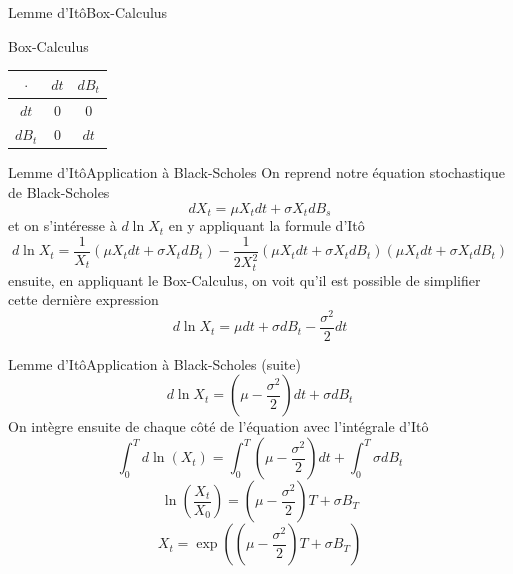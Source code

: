 \documentclass{beamer}
\newcommand{\1}{\mathmybb{1}}
\begin{document}
     \begin{frame}{Lemme d'Itô}{Box-Calculus}
       \begin{block}{Box-Calculus}
         \begin{center}
           \begin{tabular}{|c|c|c|}
             \hline
             $\cdot$ & $dt$ & $dB_t$ \\
             \hline
             $dt$ & 0 & 0 \\
             $dB_{t}$ & 0 & $dt$ \\
             \hline
           \end{tabular}
         \end{center}
         \end{block}
       \end{frame}
   \begin{frame}{Lemme d'Itô}{Application à Black-Scholes}
     On reprend notre équation stochastique de Black-Scholes
     \begin{equation}
       dX_{t} = \mu X_{t} dt + \sigma X_{t} dB_{s}
     \end{equation}
     \pause
     et on s'intéresse à $d \ln X_{t}$ en y appliquant la formule d'Itô
     \[
       d \ln X_{t} = \frac{1}{X_{t}} \left( \mu X_{t} dt + \sigma X_{t} dB_{t} \right) - \frac{1}{2X_{t}^{2}} \left( \mu X_{t} dt + \sigma X_{t} dB_{t} \right) \left( \mu X_{t}dt + \sigma X_{t} dB_{t}\right)
     \]
     \pause
     ensuite, en appliquant le Box-Calculus, on voit qu'il est possible de simplifier cette dernière expression
     \begin{equation}
       d \ln X_{t} =  \mu dt + \sigma dB_{t} - \frac{\sigma^{2}}{2} dt
     \end{equation}
   \end{frame}
   \begin{frame}{Lemme d'Itô}{Application à Black-Scholes (suite)}
     \[
       d \ln X_{t} = \left( \mu - \frac{\sigma^{2}}{2} \right) dt + \sigma dB_{t}
     \]
     \pause
     On intègre ensuite de chaque côté de l'équation avec l'intégrale d'Itô
     \[
       \int_{0}^{T} d \ln \left(  X_{t} \right) = \int_{0}^{T} \left(\mu - \frac{\sigma^{2}}{2} \right) dt + \int_{0}^{T} \sigma dB_{t}
     \]
     \pause
     \[
       \ln \left(\frac{X_{t}}{X_{0}} \right) = \left( \mu - \frac{\sigma^{2}}{2} \right) T + \sigma B_{T}
     \]
     \pause
     \begin{equation} \label{eq:9}
       X_{t} = \exp \left(  \left( \mu - \frac{\sigma^{2}}{2} \right) T + \sigma B_{T} \right)
     \end{equation}
   \end{frame}
\end{document}
